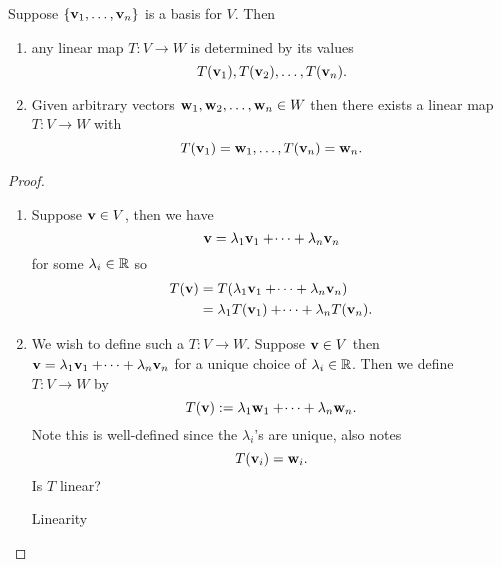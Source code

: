 \documentclass[10pt, a4paper]{article}
\begin{document}
\begin{lemma}
    Suppose $\{\mathbf{v}_1, \dotsc, \mathbf{v}_n\}$ is a basis for $V$.
    Then
    \begin{enumerate}[label = (\roman*)]
        \item any linear map $T : V \rightarrow W$ is determined by its values
        \[
        T(\mathbf{v}_1), T(\mathbf{v}_2), \dotsc, T(\mathbf{v}_n).
        \]
        \item Given arbitrary vectors $\mathbf{w}_1, \mathbf{w}_2, \dotsc, \mathbf{w}_n \in W$ then there exists a linear map $T : V \rightarrow W$ with
        \[
        T(\mathbf{v}_1) = \mathbf{w}_1, \dotsc, T(\mathbf{v}_n) = \mathbf{w}_n.
        \]
    \end{enumerate}
    \begin{proof}
        \begin{enumerate}[label = (\roman*)]
            \item Suppose $\mathbf{v} \in V$,
            then we have
            \[
            \mathbf{v} = \lambda_1\mathbf{v}_1 +  \dotsi + \lambda_n\mathbf{v}_n
            \]
            for some $\lambda_i \in \mathbb{R}$ so
            \begin{align*}
                T(\mathbf{v}) &= T(\lambda_1\mathbf{v}_1 + \dotsi + \lambda_n\mathbf{v}_n) \\
                &= \lambda_1T(\mathbf{v}_1) + \dotsi + \lambda_nT(\mathbf{v}_n).
            \end{align*}
            \item We wish to define such a $T : V \rightarrow W$.
            Suppose $\mathbf{v} \in V$ then $\mathbf{v} = \lambda_1\mathbf{v}_1 + \dotsi + \lambda_n\mathbf{v}_n$ for a unique choice of $\lambda_i \in \mathbb{R}$.
            Then we define $T : V \rightarrow W$ by
            \[
            T(\mathbf{v}) := \lambda_1\mathbf{w}_1 + \dotsi + \lambda_n\mathbf{w}_n.
            \]
            Note this is well-defined since the $\lambda_i$'s are unique,
            also notes
            \[
            T(\mathbf{v}_i) = \mathbf{w}_i.
            \]
            Is $T$ linear?

            Linearity


\end{enumerate}
\end{proof}
\end{lemma}
\end{document}
